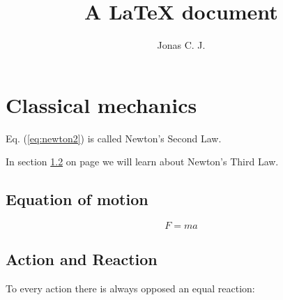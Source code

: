 \documentclass[a4paper, 12pt]{article}
\title{A \LaTeX{} document}
\author{Jonas C. J.}
\begin{document}
\maketitle
\section{Classical mechanics}
Eq. (\ref{eq:newton2}) is called Newton's Second Law. 

In section \ref{sec:actionreaction} on page \pageref{sec:actionreaction} we will learn about Newton's Third Law.

\subsection{Equation of motion}
\begin{equation}
\label{eq:newton2}
F=ma
\end{equation}
\lipsum[1-18]

\subsection{Action and Reaction}
\label{sec:actionreaction}
To every action there is always opposed an equal reaction:
\end{document}
